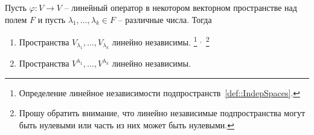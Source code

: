 \begin{claim}
\label{claim::EigenRootInd}
Пусть $\varphi\colon V\to V$ -- линейный оператор в некотором векторном пространстве над полем $F$ и пусть $\lambda_1,\ldots,\lambda_k\in F$ -- различные числа.
Тогда
\begin{enumerate}
\item Пространства $V_{\lambda_1},\ldots,V_{\lambda_k}$ линейно независимы.%
\footnote{Определение линейное независимости подпространств~\ref{def::IndepSpaces}.}
${}^{,\,}$%
\footnote{Прошу обратить внимание, что линейно независимые подпространства могут быть нулевыми или часть из них может быть нулевыми.}

\item Пространства $V^{\lambda_1},\ldots,V^{\lambda_k}$ линейно независимы.
\end{enumerate}
\end{claim}
